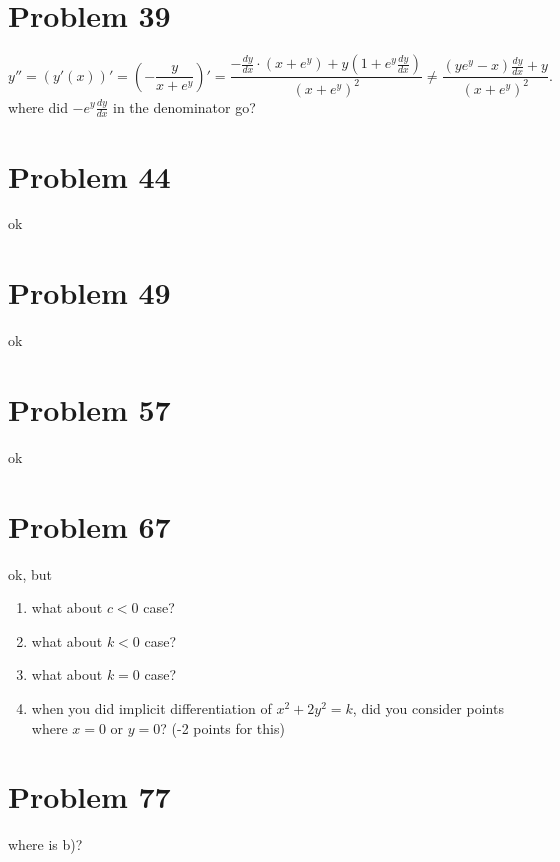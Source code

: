 \documentclass[10pt]{article} %
\begin{document}
\section*{Problem 39 }
\begin{equation*}
	y''=\left( y'(x) \right)'=\left( -\frac{y}{x+e^y} \right)'=\frac{-\frac{dy}{dx}\cdot\left( x+e^y \right)
	+y\left( 1+e^y\frac{dy}{dx} \right)}{\left( x+e^y \right)^2}\neq
	\frac{\left( ye^y-x \right)\frac{dy}{dx}+y}{\left( x+e^y \right)^2}.
\end{equation*}
where did $-e^y\frac{dy}{dx}$ in the denominator go?
\section*{Problem 44 }
ok
\section*{Problem 49 }
ok
\section*{Problem 57 }
ok
\section*{Problem 67 }
ok, but
\begin{enumerate}
	\item what about $c<0$ case?
	\item what about $k<0$ case?
	\item what about $k=0$ case?
	\item when you did implicit differentiation of $x^2+2y^2=k$, did you consider
		points where $x=0$ or $y=0$? (-2 points for this)
\end{enumerate}
\section*{Problem 77 }
where is b)?
\end{document}
